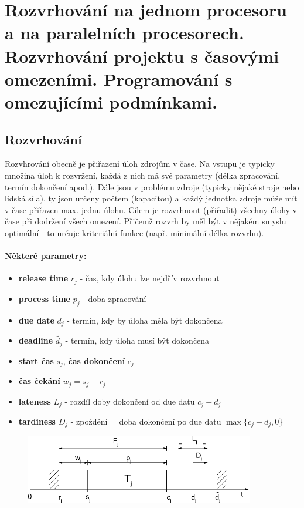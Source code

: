 \section[KO - Scheduling]{Rozvrhování na jednom procesoru a na paralelních procesorech. Rozvrhování projektu s časovými omezeními. Programování s omezujícími podmínkami.}


\subsection{Rozvrhování}
Rozvhrování obecně je přiřazení úloh zdrojům v čase. Na vstupu je typicky množina úloh k rozvržení, každá z nich má své parametry (délka zpracování, termín dokončení apod.). Dále jsou v problému zdroje (typicky nějaké stroje nebo lidská síla), ty jsou určeny počtem (kapacitou) a každý jednotka zdroje může mít v čase přiřazen max. jednu úlohu. Cílem je rozvrhnout (přiřadit) všechny úlohy v čase při dodržení všech omezení. Přičemž rozvrh by měl být v nějakém smyslu optimální - to určuje kriteriální funkce (např. minimální délka rozvrhu).

\paragraph{Některé parametry:}
\begin{itemize}[itemsep=0px]
\item \textbf{release time} $r_j$ - čas, kdy úlohu lze nejdřív rozvrhnout
\item \textbf{process time} $p_j$ - doba zpracování
\item \textbf{due date} $d_j$ - termín, kdy by úloha měla být dokončena
\item \textbf{deadline} $\widetilde{d_j}$ - termín, kdy úloha musí být dokončena
\item \textbf{start čas} $s_j$, \textbf{čas dokončení} $c_j$
\item \textbf{čas čekání} $w_j = s_j - r_j$
\item \textbf{lateness} $L_j$ - rozdíl doby dokončení od due datu $c_j - d_j$
\item \textbf{tardiness} $D_j$ - zpoždění = doba dokončení po due datu $\max\{c_j - d_j,0\}$
\end{itemize}

\begin{figure}[h]
    \begin{center}
        \includegraphics[width=100mm]{10/images/scheduling-params}
    \end{center}
\end{figure}

